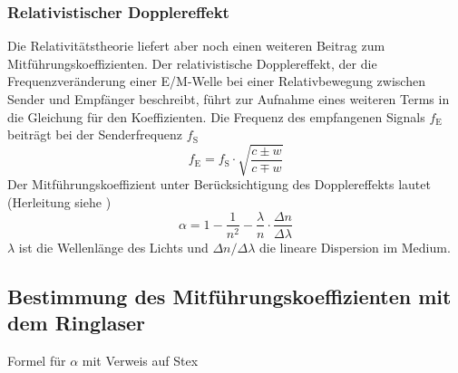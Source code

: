 \subsubsection*{Relativistischer Dopplereffekt}
Die Relativitätstheorie liefert aber noch einen weiteren Beitrag zum Mitführungskoeffizienten.
Der relativistische Dopplereffekt, der die Frequenzveränderung einer E/M-Welle
bei einer Relativbewegung zwischen Sender und Empfänger beschreibt,
führt zur Aufnahme eines weiteren Terms in die Gleichung für den Koeffizienten.
Die Frequenz des empfangenen Signals $f_\text{E}$ beiträgt bei der Senderfrequenz $f_\text{S}$
\begin{equation}
\label{}
f_\text{E} = f_\text{S} \cdot \sqrt{\frac{c \pm w}{c \mp w}}
\end{equation}
Der Mitführungskoeffizient unter Berücksichtigung des Dopplereffekts lautet (Herleitung siehe \cite{staatsex})
\begin{equation}
\label{}
\alpha = 1 - \frac{1}{n^2} - \frac{\lambda}{n} \cdot \frac{\Delta n}{\Delta \lambda}
\end{equation}
$\lambda$ ist die Wellenlänge des Lichts und $\Delta n / \Delta \lambda$ die lineare Dispersion im Medium.

\subsection{Bestimmung des Mitführungskoeffizienten mit dem Ringlaser}


Formel für $\alpha$ mit Verweis auf Stex